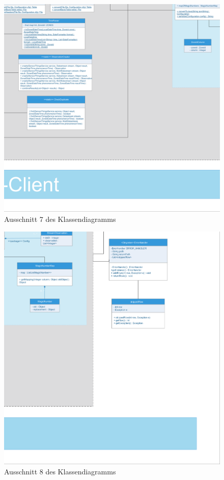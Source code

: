 \begin{figure}[!h]
\centering
\includegraphics[scale=0.4]{uml/screenshots/frithjof/slice_1_2}
\caption{Ausschnitt 7 des Klassendiagramms}
\end{figure}
\clearpage

\begin{figure}[!h]
\centering
\includegraphics[scale=0.4]{uml/screenshots/frithjof/slice_1_3}
\caption{Ausschnitt 8 des Klassendiagramms}
\end{figure}